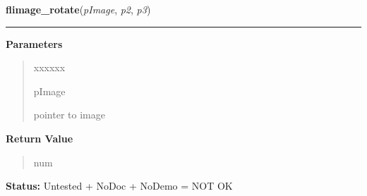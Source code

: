 \hspace{.8\funcindent}\begin{boxedminipage}{\funcwidth}

    \raggedright \textbf{flimage\_rotate}(\textit{pImage}, \textit{p2}, \textit{p3})

    \vspace{-1.5ex}

    \rule{\textwidth}{0.5\fboxrule}
\setlength{\parskip}{2ex}
\setlength{\parskip}{1ex}
      \textbf{Parameters}
      \vspace{-1ex}

      \begin{quote}
        \begin{Ventry}{xxxxxx}

          \item[pImage]

          pointer to image

        \end{Ventry}

      \end{quote}

      \textbf{Return Value}
    \vspace{-1ex}

      \begin{quote}
      num

      \end{quote}

\textbf{Status:} Untested + NoDoc + NoDemo = NOT OK



    \end{boxedminipage}

    \label{xformslib:flflimage:flimage_flip}

    \vspace{0.5ex}


